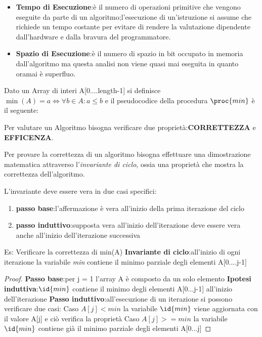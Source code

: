 \begin{itemize}
  \item \textbf{Tempo di Esecuzione}:è il numero di operazioni primitive che vengono eseguite
        da parte di un algoritmo;l'esecuzione di un'istruzione si assume che richiede un tempo costante
        per evitare di rendere la valutazione dipendente dall'hardware e dalla bravura del programmatore.
  \item \textbf{Spazio di Esecuzione}:è il numero di spazio in bit occupato in memoria dall'algoritmo
        ma questa analisi non viene quasi mai eseguita in quanto oramai è superfluo.
\end{itemize}

Dato un Array di interi A[0....length-1] si definisce $\min (A) = a \Leftrightarrow \forall b \in A : a \leq b$
e il pseudocodice della procedura $\proc{min}$ è il seguente:



Per valutare un Algoritmo bisogna verificare due proprietà:\textbf{CORRETTEZZA} e
\textbf{EFFICENZA}.

Per provare la correttezza di un algoritmo bisogna effettuare una dimostrazione
matematica attraverso l'\textit{invariante di ciclo}, ossia una proprietà che mostra
la correttezza dell'algoritmo.

L'invariante deve essere vera in due casi specifici:
\begin{enumerate}
  \item \textbf{passo base}:l'affermazione è vera all'inizio della prima iterazione del ciclo
  \item \textbf{passo induttivo}:supposta vera all'inizio dell'iterazione deve essere vera
        anche all'inizio dell'iterazione successiva
\end{enumerate}

Es: Verificare la correttezza di min(A)
\textbf{Invariante di ciclo}:all'inizio di ogni iterazione la variabile \textit{min} contiene
il minimo parziale degli elementi A[0....j-1]

\begin{proof}
\textbf{Passo base}:per j = 1 l'array A è composto da un solo elemento \newline
\textbf{Ipotesi induttiva}:$\id{min}$ contiene il minimo degli elementi A[0...j-1] all'inizio dell'iterazione\newline
\textbf{Passo induttivo}:all'esecuzione di un iterazione si possono verificare due casi:\newline
Caso $A[j] < min$\newline \newline
      la variabile $\id{min}$ viene aggiornata con il valore A[j] e ciò verifica la proprietà\newline
Caso $A[j] >= min$\newline \newline
      la variabile $\id{min}$ contiene già il minimo parziale degli elementi A[0...j]
\end{proof}

